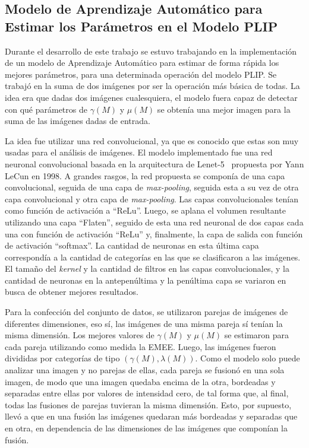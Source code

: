\subsection{Modelo de Aprendizaje Autom\'atico para Estimar los Par\'ametros en el Modelo PLIP}

Durante el desarrollo de este trabajo se estuvo trabajando en la implementaci\'on de un modelo de Aprendizaje Autom\'atico para estimar de forma r\'apida los mejores par\'ametros, para una determinada operaci\'on del modelo PLIP. Se trabaj\'o en la suma de dos im\'agenes por ser la operaci\'on m\'as b\'asica de todas. La idea era que dadas dos im\'agenes cualesquiera, el modelo fuera capaz de detectar con qu\'e par\'ametros de $\gamma(M)$ y $\mu(M)$ se obten\'ia una mejor imagen para la suma de las im\'agenes dadas de entrada.

La idea fue utilizar una red convolucional, ya que es conocido que estas son muy usadas para el an\'alisis de im\'agenes. El modelo implementado fue una red neuronal convolucional basada en la arquitectura de Lenet-5~\cite{lecun1998gradient} propuesta por Yann LeCun en 1998. A grandes rasgos, la red propuesta se compon\'ia de una capa convolucional, seguida de una capa de \textit{max-pooling}, seguida esta a su vez de otra capa convolucional y otra capa de \textit{max-pooling}. Las capas convolucionales ten\'ian como funci\'on de activaci\'on a ``ReLu''. Luego, se aplana el volumen resultante utilizando una capa ``Flaten'', seguido de esta una red neuronal de dos capas cada una con funci\'on de activaci\'on ``ReLu'' y, finalmente, la capa de salida con funci\'on de activaci\'on ``softmax''. La cantidad de neuronas en esta \'ultima capa correspond\'ia a la cantidad de categor\'ias en las que se clasificaron a las im\'agenes. El tama\~no del \textit{kernel} y la cantidad de filtros en las capas convolucionales, y la cantidad de neuronas en la antepen\'ultima y la pen\'ultima capa se variaron en busca de obtener mejores resultados.

Para la confecci\'on del conjunto de datos, se utilizaron parejas de im\'agenes de diferentes dimensiones, eso s\'i, las im\'agenes de una misma pareja s\'i ten\'ian la misma dimensi\'on. Los mejores valores de $\gamma(M)$ y $\mu(M)$ se estimaron para cada pareja utilizando como medida la EMEE. Luego, las im\'agenes fueron divididas por categor\'ias de tipo $(\gamma(M),\lambda(M))$. Como el modelo solo puede analizar una imagen y no parejas de ellas, cada pareja se fusion\'o en una sola imagen, de modo que una imagen quedaba encima de la otra, bordeadas y separadas entre ellas por valores de intensidad cero, de tal forma que, al final, todas las fusiones de parejas tuvieran la misma dimensi\'on. Esto, por supuesto, llev\'o a que en una fusi\'on las im\'agenes quedaran m\'as bordeadas y separadas que en otra, en dependencia de las dimensiones de las im\'agenes que compon\'ian la fusi\'on.

